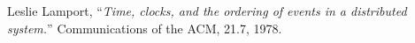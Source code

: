 \documentclass[../main.tex]{subfiles}
\begin{document}
\begin{thebibliography}{999}

  Leslie Lamport,
  ``\textit{Time, clocks, and the ordering of events in a distributed system.}''
  Communications of the ACM,
  21.7,
  1978.

\end{thebibliography}
\end{document}
